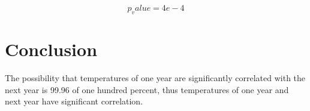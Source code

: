 \documentclass{article}\usepackage[]{graphicx}\usepackage[]{color}
\begin{document}
  \begin{equation}
    p_value = 4e-4
  \end{equation}
  \section{Conclusion}
    The possibility that temperatures of one year are significantly correlated with the next year is 99.96 of one      hundred percent, thus temperatures of one year and next year have significant correlation.
\end{document}
